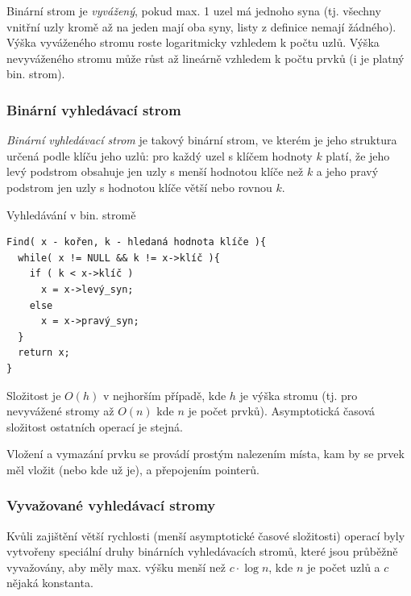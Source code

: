 Binární strom je \emph{vyvážený}, pokud max. 1 uzel má jednoho syna (tj. všechny vnitřní uzly kromě až na jeden mají oba syny, listy z definice nemají žádného). Výška vyváženého stromu roste logaritmicky vzhledem k počtu uzlů. Výška nevyváženého stromu může růst až lineárně vzhledem k počtu prvků (i  je platný bin. strom).


\subsubsection*{Binární vyhledávací strom}

\begin{definice}
\emph{Binární vyhledávací strom} je takový binární strom, ve kterém je jeho struktura určená podle klíču jeho uzlů: pro každý uzel s klíčem hodnoty $k$ platí, že jeho levý podstrom obsahuje jen uzly s menší hodnotou klíče než $k$ a jeho pravý podstrom jen uzly s hodnotou klíče větší nebo rovnou $k$.
\end{definice}

\begin{algoritmusN}{Vyhledávání v bin. stromě}
\begin{verbatim}
Find( x - kořen, k - hledaná hodnota klíče ){
  while( x != NULL && k != x->klíč ){
    if ( k < x->klíč )
      x = x->levý_syn;
    else
      x = x->pravý_syn;
  }
  return x;
}
\end{verbatim}

Složitost je $O(h)$ v nejhorším případě, kde $h$ je výška stromu (tj. pro nevyvážené stromy až $O(n)$ kde $n$ je počet prvků). Asymptotická časová složitost ostatních operací je stejná.

Vložení a vymazání prvku se provádí prostým nalezením místa, kam by se prvek měl vložit (nebo kde už je), a přepojením pointerů.
\end{algoritmusN}

\subsubsection*{Vyvažované vyhledávací stromy}

Kvůli zajištění větší rychlosti (menší asymptotické časové složitosti) operací byly vytvořeny speciální druhy binárních vyhledávacích stromů, které jsou průběžně vyvažovány, aby měly max. výšku menší než $c\cdot\log n$, kde $n$ je počet uzlů a $c$ nějaká konstanta.

